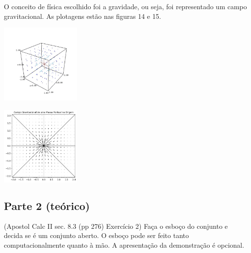 \documentclass[../main.tex]{subfiles}
\begin{document}
		\begin{solucao}
			O conceito de física escolhido foi a gravidade, ou seja, foi representado um campo gravitacional. As plotagens estão nas figuras 14 e 15.
			
			\begin{center}
				\includegraphics[width=0.3\textwidth]{imagens/lista03/picture_lista03_q04.jpg}
			\end{center}
			
			\begin{center}
				\includegraphics[width=0.3\textwidth]{imagens/lista03/picture_lista03_q04.png.jpg}
			\end{center}
		\end{solucao}
		\subsection{Parte 2 (teórico)}
		\begin{exercicio}{1}
			(Apostol Calc II sec. 8.3 (pp 276) Exercício 2)
			Faça o esboço do conjunto e decida se é um conjunto aberto. O esboço pode ser feito tanto computacionalmente quanto à mão. A apresentação da demonstração é opcional.
		\end{exercicio}
		
\end{document}
